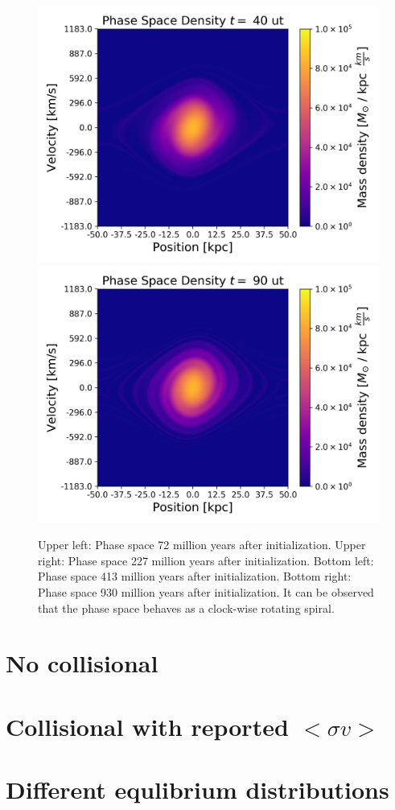 \begin{figure}[ht!]
    \includegraphics[scale=0.45]{imag/phase40.png}
    \includegraphics[scale=0.45]{imag/phase90.png}
    \caption{Upper left: Phase space 72 million years after initialization. Upper right: Phase space 227 million years after initialization. Bottom left: Phase space 413 million years after initialization. Bottom right: Phase space 930 million years after initialization. It can be observed that the phase space behaves as a clock-wise rotating spiral.}
    \label{1dphase}
\end{figure}














\section{No collisional}
\section{Collisional with reported $<\sigma v>$}
\section{Different equlibrium distributions}










